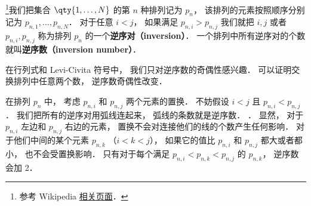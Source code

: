 
\begin{issues}
\issueDraft
\end{issues}


\footnote{参考 Wikipedia \href{https://en.wikipedia.org/wiki/Inversion_(discrete_mathematics)}{相关页面}．}我们把集合 $\qty{1,\dots,N}$ 的第 $n$ 种排列记为 $p_n$， 该排列的元素按照顺序分别记为 $p_{n,1}, \dots, p_{n,N}$． 对于任意 $i < j$， 如果满足 $p_{n,i} > p_{n,j}$ 我们就把 $i, j$ 或者 $p_{n,i}, p_{n,j}$ 称为排列 $p_n$ 的一个\textbf{逆序对（inversion）}． 一个排列中所有逆序对的个数就叫\textbf{逆序数（inversion number）}．

在行列式和 Levi-Civita 符号中， 我们只对逆序数的奇偶性感兴趣． 可以证明交换排列中任意两个数， 逆序数奇偶性改变． 

在排列 $p_n$ 中， 考虑 $p_{n,i}$ 和 $p_{n,j}$ 两个元素的置换． 不妨假设 $i < j$ 且 $p_{n,i} < p_{n,j}$． 我们把所有的逆序对用弧线连起来， 弧线的条数就是逆序数． ． 显然， 对于 $p_{n,i}$ 左边和 $p_{n,j}$ 右边的元素， 置换不会对连接他们的线的个数产生任何影响． 对于他们中间的某个元素 $p_{n, k}$ （$i < k < j$）， 如果它的值比 $p_{n,i}$ 和 $p_{n,j}$ 都大或者都小， 也不会受置换影响． 只有对于每个满足 $p_{n,i} < p_{n,k} < p_{n,j}$ 的 $p_{n,k}$， 逆序数会加 2．
